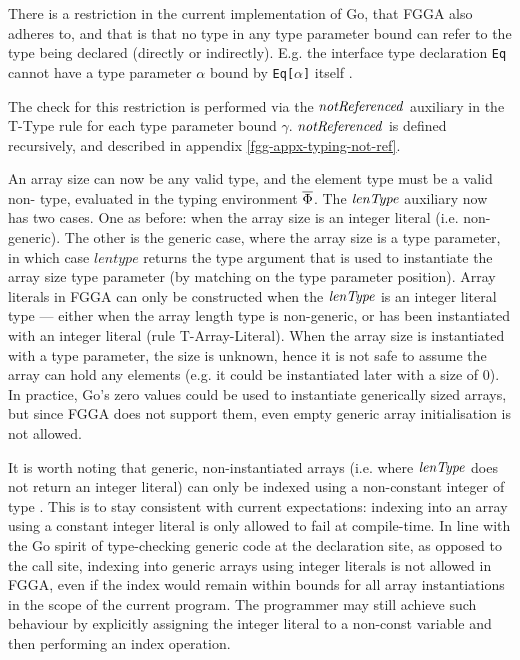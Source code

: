 There is a restriction in the current implementation of Go, that FGGA also
adheres to, and that is that no type in any type parameter bound can refer to
the type being declared (directly or indirectly). E.g. the interface type
declaration \texttt{Eq} cannot have a type parameter $\alpha$ bound by
\texttt{Eq[$\alpha$]} itself \autocite{spec}.

The check for this restriction is performed via the $\mathit{notReferenced}$ auxiliary in the
T-Type rule for each type parameter bound $\gamma$. $\mathit{notReferenced}$ is defined
recursively, and described in appendix \ref{fgg-appx-typing-not-ref}.

An array size can now be any valid  type, and the element type must be
a valid non- type, evaluated in the typing environment $\overline{\Phi}$.
The $\mathit{lenType}$ auxiliary now has two cases. One as before: when the array size
is an integer literal (i.e. non-generic). The other is the generic case, where
the array size is a type parameter, in which case $lentype$ returns the type
argument that is used to instantiate the array size type parameter (by matching
on the type parameter position). Array literals in FGGA can only be constructed
when the $\mathit{lenType}$ is an integer literal type --- either when the array length
type is non-generic, or has been instantiated with an integer literal (rule
T-Array-Literal). When the array size is instantiated with a type parameter, the
size is unknown, hence it is not safe to assume the array can hold any elements
(e.g. it could be instantiated later with a size of 0). In practice, Go's zero
values could be used to instantiate generically sized arrays, but since FGGA
does not support them, even empty generic array initialisation is not allowed.

It is worth noting that generic, non-instantiated arrays (i.e. where $\mathit{lenType}$
does not return an integer literal) can only be indexed using a non-constant
integer of type . This is to stay consistent with current expectations:
indexing into an array using a constant integer literal is only allowed to fail
at compile-time. In line with the Go spirit of type-checking generic code at the
declaration site, as opposed to the call site, indexing into generic arrays
using integer literals is not allowed in FGGA, even if the index would remain
within bounds for all array instantiations in the scope of the current program.
The programmer may still achieve such behaviour by explicitly assigning the
integer literal to a non-const  variable and then performing an index
operation.

